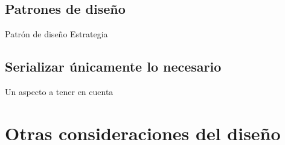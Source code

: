 \subsection{Patrones de diseño}

Patrón de diseño Estrategia


\subsection{Serializar únicamente lo necesario}

Un aspecto a tener en cuenta 

\section{Otras consideraciones del diseño}